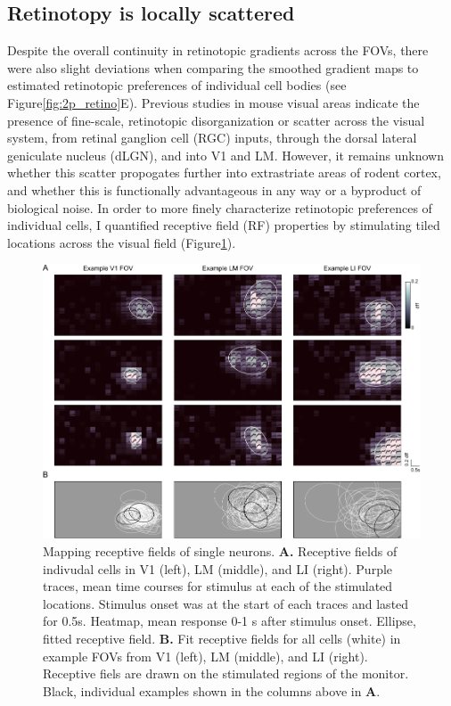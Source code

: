 \subsection{Retinotopy is locally scattered}
Despite the overall continuity in retinotopic gradients across the FOVs, there were also slight deviations when comparing the smoothed gradient maps to estimated retinotopic preferences of individual cell bodies (see Figure\ref{fig:2p_retino}E). Previous studies in mouse visual areas indicate the presence of fine-scale, retinotopic disorganization or scatter across the visual system, from retinal ganglion cell (RGC) inputs, through the dorsal lateral geniculate nucleus (dLGN), and into V1 and LM\cite{Bonin2011, Andermann2011, Liang2018, Marques2018}. However, it remains unknown whether this scatter propogates further into extrastriate areas of rodent cortex, and whether this is functionally advantageous in any way or a byproduct of biological noise. In order to more finely characterize retinotopic preferences of individual cells, I quantified receptive field (RF) properties by stimulating tiled locations across the visual field (Figure\ref{fig:rf_examples}). 

\begin{figure}[t!]
    \includegraphics[width=\textwidth]{figures/chapter_3/fig_3-3_rf_examples/fig_3-3_rf_examples.pdf}
    \vspace{.1in}
    \caption[Receptive field mapping]{Mapping receptive fields of single neurons. \textbf{A.} Receptive fields of indivudal cells in V1 (left), LM (middle), and LI (right). Purple traces, mean time courses for stimulus at each of the stimulated locations. Stimulus onset was at the start of each traces and lasted for 0.5s. Heatmap, mean response 0-1 s after stimulus onset. Ellipse, fitted receptive field.
    \textbf{B.} Fit receptive fields for all cells (white) in example FOVs from V1 (left), LM (middle), and LI (right). Receptive fiels are drawn on the stimulated regions of the monitor. Black, individual examples shown in the columns above in \textbf{A}.
    \label{fig:rf_examples}}
\end{figure}

